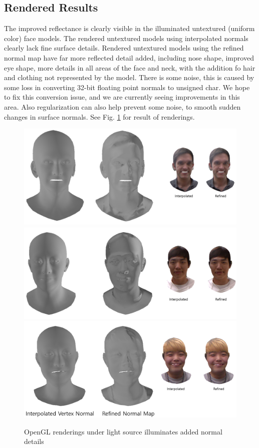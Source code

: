 \documentclass[10pt,twocolumn,letterpaper]{article}
\begin{document}
\subsection{Rendered Results}
The improved reflectance is clearly visible in the illuminated untextured (uniform color) face models. The rendered untextured models using interpolated normals clearly lack fine surface details. Rendered untextured models using the refined normal map have far more reflected detail added, including nose shape, improved eye shape, more details in all areas of the face and neck, with the addition fo hair and clothing not represented by the model. There is some noise, this is caused by some loss in converting 32-bit floating point normals to unsigned char. We hope to fix this conversion issue, and we are currently seeing improvements in this area. Also regularization can also help prevent some noise, to smooth sudden changes in surface normals. See Fig. \ref{fig:render} for result of renderings.


\begin{figure}[h]
    \begin{center}
        \includegraphics [scale=0.45] {image/render1.png}
        \includegraphics [scale=0.45] {image/render2.png}
        \includegraphics [scale=0.45] {image/render3.png}
    \end{center}
    \caption{OpenGL renderings under light source illuminates added normal details}
    \label{fig:render}
\end{figure} 
\end{document}
